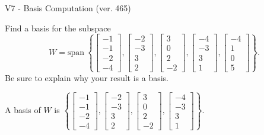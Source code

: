 \begin{exercise}
  \begin{exerciseTitle}V7 - Basis Computation (ver. 465)\end{exerciseTitle}
  \begin{exerciseStatement}
    Find a basis for the subspace 
\[W=\mathrm{span}\ \left\{\left[\begin{array}{r}
-1 \\
-1 \\
-2 \\
-4
\end{array}\right] , \left[\begin{array}{r}
-2 \\
-3 \\
3 \\
2
\end{array}\right] , \left[\begin{array}{r}
3 \\
0 \\
2 \\
-2
\end{array}\right] , \left[\begin{array}{r}
-4 \\
-3 \\
3 \\
1
\end{array}\right] , \left[\begin{array}{r}
-4 \\
1 \\
0 \\
5
\end{array}\right]\right\}.\]
 Be sure to explain why your result is a basis.


  \end{exerciseStatement}
  \begin{exerciseAnswer}
   A basis of \(W\) is  \(\left\{\left[\begin{array}{r}
-1 \\
-1 \\
-2 \\
-4
\end{array}\right] , \left[\begin{array}{r}
-2 \\
-3 \\
3 \\
2
\end{array}\right] , \left[\begin{array}{r}
3 \\
0 \\
2 \\
-2
\end{array}\right] , \left[\begin{array}{r}
-4 \\
-3 \\
3 \\
1
\end{array}\right]\right\}\).
  


  \end{exerciseAnswer}
\end{exercise}